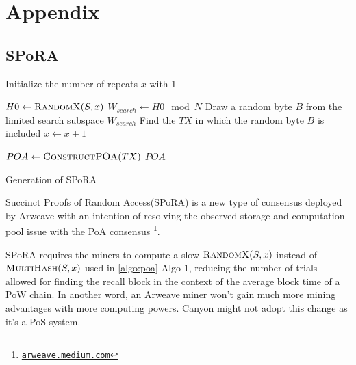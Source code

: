 \documentclass[]{article}
\begin{document}
\appendix
\section{Appendix}

\subsection{SPoRA}

\IncMargin{1em}
\begin{algorithm}
    \label{algo:spora}

    \SetAlgoNoLine

    \BlankLine

    Initialize the number of repeats $x$ with 1\;
    \BlankLine

    \Repeat
        {}
        {
        $H0 \leftarrow \Call{RandomX}{S, x}$\;
        $W_{search} \leftarrow H0 \mod N$\;
        Draw a random byte $B$ from the limited search subspace $W_{search}$\;
        Find the $TX$ in which the random byte $B$ is included\;
        {$x \leftarrow x + 1$}\;
    }

    \BlankLine
    $POA \leftarrow \Call{ConstructPOA}{TX}$\;
    \Return $POA$\;
    \caption{Generation of SPoRA}
\end{algorithm}
\DecMargin{1em}

Succinct Proofs of Random Access(SPoRA) is a new type of consensus deployed by Arweave with an intention of resolving the observed storage and computation pool issue with the PoA consensus \footnote{\href{https://arweave.medium.com/the-arweave-network-is-now-running-succinct-random-proofs-of-access-spora-e2732cbcbb46}{\nolinkurl{arweave.medium.com}}}.

SPoRA requires the miners to compute a slow $\Call{RandomX}{S, x}$ instead of $\Call{MultiHash}{S, x}$ used in \ref{algo:poa}{ Algo 1}, reducing the number of trials allowed for finding the recall block in the context of the average block time of a PoW chain. In another word, an Arweave miner won't gain much more mining advantages with more computing powers. Canyon might not adopt this change as it's a PoS system.
\end{document}
